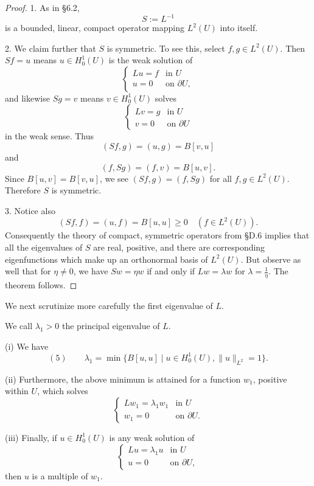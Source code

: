 \begin{proof}
1. As in \S6.2,
$$S := L^{-1}$$
is a bounded, linear, compact operator mapping $L^2(U)$ into itself.

2. We claim further that $S$ is symmetric. To see this, select $f,g \in L^2(U)$. Then $Sf = u$ means $u \in H_0^1(U)$ is the weak solution of
$$\begin{cases} Lu = f & \text{in } U \\ u = 0 & \text{on } \partial U, \end{cases}$$
and likewise $Sg = v$ means $v \in H_0^1(U)$ solves
$$\begin{cases} Lv = g & \text{in } U \\ v = 0 & \text{on } \partial U \end{cases}$$
in the weak sense. Thus
$$(Sf,g) = (u,g) = B[v,u]$$
and
$$(f,Sg) = (f,v) = B[u,v].$$
Since $B[u,v] = B[v,u]$, we see $(Sf,g) = (f,Sg)$ for all $f,g \in L^2(U)$. Therefore $S$ is symmetric.

3. Notice also
$$(Sf,f) = (u,f) = B[u,u] \geq 0 \quad (f \in L^2(U)).$$
Consequently the theory of compact, symmetric operators from \S D.6 implies that all the eigenvalues of $S$ are real, positive, and there are corresponding eigenfunctions which make up an orthonormal basis of $L^2(U)$. But observe as well that for $\eta \neq 0$, we have $Sw = \eta w$ if and only if $Lw = \lambda w$ for $\lambda = \frac1\eta$. The theorem follows.
\end{proof}

We next scrutinize more carefully the first eigenvalue of $L$.

\begin{definition}
\label{def:principal-eigenvalue}
We call $\lambda_1 > 0$ the principal eigenvalue of $L$.
\end{definition}

\begin{theorem}
\label{thm:variational-principle-principal-eigenvalue}
(i) We have
$$(5) \qquad \lambda_1 = \min\{B[u,u] \mid u \in H_0^1(U), \|u\|_{L^2} = 1\}.$$

(ii) Furthermore, the above minimum is attained for a function $w_1$, positive within $U$, which solves
$$\begin{cases} Lw_1 = \lambda_1w_1 & \text{in } U \\ w_1 = 0 & \text{on } \partial U. \end{cases}$$

(iii) Finally, if $u \in H_0^1(U)$ is any weak solution of
$$\begin{cases} Lu = \lambda_1u & \text{in } U \\ u = 0 & \text{on } \partial U, \end{cases}$$
then $u$ is a multiple of $w_1$.
\end{theorem}

